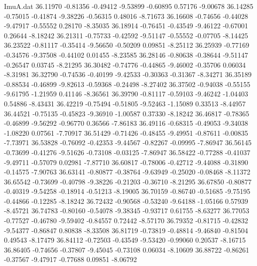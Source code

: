 \begin{filecontents}{ImuA.dat}
  36.11970   -0.81356   -0.49412   -9.53899   -0.60895    0.57176   -9.00678
  36.14285   -0.75015   -0.41874   -9.38226   -0.56315    0.48016   -8.71673
  36.16608   -0.74656   -0.44028   -9.47917   -0.55552    0.28170   -8.35035
  36.18914   -0.76451   -0.43549   -9.46122   -0.67001    0.26644   -8.18242
  36.21311   -0.75733   -0.42592   -9.51147   -0.55552   -0.07705   -8.14425
  36.23522   -0.81117   -0.35414   -9.56650   -0.50209    0.09851   -8.25112
  36.25939   -0.77169   -0.34576   -9.37508   -0.44102    0.01455   -8.23585
  36.28146   -0.80638   -0.38644   -9.51147   -0.26547    0.03745   -8.21295
  36.30482   -0.74776   -0.44865   -9.46002   -0.35706    0.06034   -8.31981
  36.32790   -0.74536   -0.40199   -9.42533   -0.30363   -0.31367   -8.34271
  36.35189   -0.88534   -0.46899   -9.82613   -0.59368   -0.24498   -8.27402
  36.37502   -0.94038   -0.55155   -9.61795   -1.21959    0.41146   -8.36561
  36.39790   -0.81117   -0.59103   -9.46242   -1.04403    0.54886   -8.43431
  36.42219   -0.75494   -0.51805   -9.52463   -1.15089    0.33513   -8.44957
  36.44521   -0.75135   -0.45823   -9.36910   -1.00587    0.37330   -8.18242
  36.46817   -0.78365   -0.46899   -9.56292   -0.96770    0.36566   -7.86183
  36.49116   -0.68315   -0.49053   -9.34038   -1.08220    0.07561   -7.70917
  36.51429   -0.71426   -0.48455   -9.49951   -0.87611   -0.00835   -7.73971
  36.53828   -0.76092   -0.42353   -9.44567   -0.82267   -0.09995   -7.86947
  36.56145   -0.73699   -0.41276   -9.51626   -0.73108   -0.03125   -7.86947
  36.58422   -0.77288   -0.41037   -9.49711   -0.57079    0.02981   -7.87710
  36.60817   -0.78006   -0.42712   -9.44088   -0.31890   -0.14575   -7.90763
  36.63141   -0.80877   -0.38764   -9.63949   -0.25020   -0.08468   -8.11372
  36.65542   -0.73699   -0.40798   -9.38226   -0.21203   -0.36710   -8.21295
  36.67850   -0.80877   -0.40319   -9.54258   -0.18914   -0.51213   -8.19005
  36.70159   -0.86740   -0.51685   -9.75195   -0.44866   -0.12285   -8.18242
  36.72432   -0.90568   -0.53240   -9.64188   -1.05166    0.57939   -8.45721
  36.74783   -0.80160   -0.54078   -9.38345   -0.93717    0.61755   -8.63277
  36.77053   -0.77527   -0.46780   -9.59402   -0.84557    0.72442   -8.57170
  36.79352   -0.81715   -0.42832   -9.54377   -0.86847    0.80838   -8.33508
  36.81719   -0.73819   -0.48814   -9.46840   -0.81504    0.49543   -8.17479
  36.84112   -0.72503   -0.43549   -9.53420   -0.99060    0.20537   -8.16715
  36.86405   -0.74656   -0.37807   -9.45045   -0.73108    0.06034   -8.10609
  36.88722   -0.86261   -0.37567   -9.47917   -0.77688    0.09851   -8.06792

\end{filecontents}
